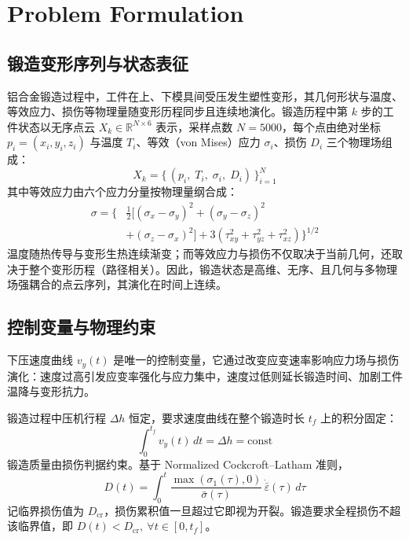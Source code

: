 \section{Problem Formulation}

\subsection{锻造变形序列与状态表征}
铝合金锻造过程中，工件在上、下模具间受压发生塑性变形，其几何形状与温度、等效应力、损伤等物理量随变形历程同步且连续地演化。锻造历程中第 $k$ 步的工件状态以无序点云 $X_k \in \mathbb{R}^{N \times 6}$ 表示，采样点数 $N=5000$，每个点由绝对坐标 $p_i=(x_i,y_i,z_i)$ 与温度 $T_i$、等效（von Mises）应力 $\sigma_i$、损伤 $D_i$ 三个物理场组成：
\begin{equation}
X_k = \{\,(p_i,\; T_i,\; \sigma_i,\; D_i)\,\}_{i=1}^{N}
\label{equ:pointcloud}
\end{equation}
其中等效应力由六个应力分量按物理量纲合成：
\begin{equation}
\begin{split}
\sigma = \Big\{ &\tfrac{1}{2}\big[(\sigma_x-\sigma_y)^2+(\sigma_y-\sigma_z)^2 \\
&+(\sigma_z-\sigma_x)^2\big]+3(\tau_{xy}^2+\tau_{yz}^2+\tau_{xz}^2)\Big\}^{1/2}
\end{split}
\end{equation}
温度随热传导与变形生热连续渐变；而等效应力与损伤不仅取决于当前几何，还取决于整个变形历程（路径相关）。因此，锻造状态是高维、无序、且几何与多物理场强耦合的点云序列，其演化在时间上连续。

\subsection{控制变量与物理约束}
下压速度曲线 $v_y(t)$ 是唯一的控制变量，它通过改变应变速率影响应力场与损伤演化：速度过高引发应变率强化与应力集中，速度过低则延长锻造时间、加剧工件温降与变形抗力。

锻造过程中压机行程 $\Delta h$ 恒定，要求速度曲线在整个锻造时长 $t_f$ 上的积分固定：
\begin{equation}
\int_{0}^{t_f} v_y(t)\,dt = \Delta h = \text{const}
\end{equation}
锻造质量由损伤判据约束。基于 Normalized Cockcroft--Latham 准则，
\begin{equation}
D(t) = \int_0^t \frac{\max(\sigma_1(\tau),0)}{\bar{\sigma}(\tau)}\,\dot{\bar{\varepsilon}}(\tau)\,d\tau
\end{equation}
记临界损伤值为 $D_{\text{cr}}$，损伤累积值一旦超过它即视为开裂。锻造要求全程损伤不超该临界值，即 $D(t) < D_{\text{cr}},\ \forall t\in[0,t_f]$。

